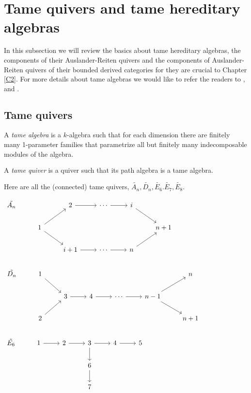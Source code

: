 \section{Tame quivers and tame hereditary algebras}
\indent In this subsection we will review the basics about tame hereditary algebras, the components of their Auslander-Reiten quivers and the components of Auslander-Reiten quivers of their bounded derived categories for they are crucial to Chapter \ref{C2}. For more details about tame algebras we would like to refer the readers to \cite{DR76}, \cite{R84} and \cite{SS06}.\\
\subsection{Tame quivers}
\begin{definition}
A \textit{tame algebra} is a $k$-algebra such that for each dimension there are finitely many 1-parameter families that parametrize all but finitely many indecomposable modules of the algebra.\\
\end{definition}
\begin{definition}
A \textit{tame quiver} is a quiver such that its path algebra is a tame algebra.\\
\end{definition}
\begin{example}
Here are all the (connected) tame quivers, $\tilde{A_n}, \tilde{D_n}, \tilde{E_6}. \tilde{E_7}, \tilde{E_8}$.
\end{example}
$\begin{tikzcd}
\tilde{A_n} &    		&2\arrow[r]  &\cdots\arrow[r]    &i\arrow[rd]	 &\\
&1\arrow[rd]\arrow[ru]& 		  &  				&   		&n+1\\
&     				&i+1\arrow[r]&\cdots\arrow[r] 	&n\arrow[ru]& \\
\end{tikzcd}$\\
$\begin{tikzcd}
\tilde{D_n} &1\arrow[rd] &  		& 		     &		         		&					&n	\\
&		&3\arrow[r]&  4\arrow[r] & \cdots\arrow[r]           &n-1\arrow[rd]\arrow[ru] 	&\\
&2\arrow[ru]&		&   		    & 					& 					&n+1\\
\end{tikzcd}$\\
$\begin{tikzcd}
\tilde{E_6}& 1\arrow[r] & 2\arrow[r] & 3\arrow[r]\arrow[d] & 4\arrow[r] & 5\\
&		&		&  6\arrow[d] & 			& \\
&		&		&  7 & 			& \\
\end{tikzcd}$\\
